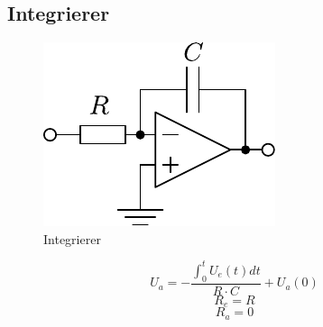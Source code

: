 



\subsection{Integrierer}
\begin{figure}[h!]
	\centering
	\includegraphics[scale=\schscale]{op_int.pdf}
	\caption{Integrierer}
	\label{sch:op-int}
\end{figure}
\[ U_a = - \frac{\int_{0}^{t} U_e(t) dt}{R \cdot C} + U_a(0) \]
\[ R_e = R \]
\[ R_a = 0 \]